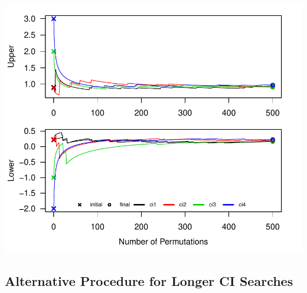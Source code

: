 \documentclass[12pt]{article}\usepackage[]{graphicx}\usepackage[]{color}
\makeatletter
\def\maxwidth{ %
  \ifdim\Gin@nat@width>\linewidth
    \linewidth
  \else
    \Gin@nat@width
  \fi
}
\newenvironment{knitrout}{}{} %
\makeatother
\begin{document}
\begin{knitrout}
\color{fgcolor}

{\centering \includegraphics[width=\maxwidth]{figure/ci_plots3-1} 

}



\end{knitrout}

\subsection{Alternative Procedure for Longer CI Searches}
\label{GJ}
\end{document}
